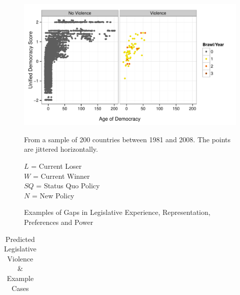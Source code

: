 \documentclass[a4paper]{article}\usepackage{graphicx, color}
\newenvironment{knitrout}{}{} %
\begin{document}
{{\begin{figure}
\begin{center}
\begin{knitrout}
\color{fgcolor}\includegraphics[width=0.8\linewidth]{figure/ScatterDem} 
\end{knitrout}


  \end{center}
    \begin{singlespace}
        {\scriptsize{From a sample of 200 countries between 1981 and 2008. The points are jittered horizontally.}}
    \end{singlespace}
\end{figure}

\begin{figure}[h!]
    \caption{Examples of Gaps in Legislative Experience, Representation, Preferences and Power}
    \label{example_gaps}
    \begin{center}

        

    \end{center}
        \begin{singlespace}
        {\scriptsize{$L$ = Current Loser \\
                        $W$ = Current Winner \\
                        $SQ$ = Status Quo Policy \\
                        $N$ = New Policy
                    }}
    \end{singlespace}

\end{figure}


\begin{table}[!h]
    \begin{center}
    \caption{Predicted Legislative Violence \& Example Cases}
    \label{leg.v.framework}
    \begin{tabular}{c | c c}
        

\end{tabular}
\end{center}
\end{table}}}
\end{document}

